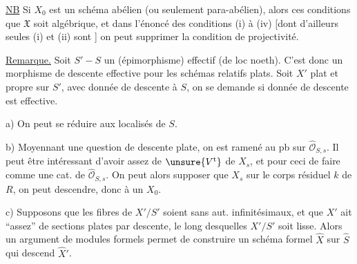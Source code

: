 \uline{NB} Si $X_0$ est un schéma abélien  (ou seulement para-abélien), alors ces conditions   que $\mathfrak X$ soit algébrique, et dans l'énoncé des conditions (i) à (iv) [dont d'ailleurs seules (i) et (ii) sont ] on peut supprimer la condition de projectivité.

\uline{Remarque.} Soit $S'\mathbin{-}S$ un
(épimorphisme) effectif (de loc noeth). C'est donc un morphisme de descente effective pour les schémas relatifs plats. Soit $X'$ plat et propre sur $S'$, avec donnée de descente à $S$, on  se demande si donnée de descente est effective.

a) On peut se réduire aux localisés  de $S$.

b) Moyennant une question de descente   plate, on est ramené au pb sur $\widehat{\mathcal O}_{S,s}$. Il peut être intéressant d'avoir  assez de $\unsure{V^{\mathrm t}}$ de $X_s$, et pour ceci de faire comme une cat.    de $\widehat{\mathcal O}_{S,s}$. On peut alors supposer que $X_s$ sur le corps résiduel $k$ de $R$, on peut descendre, donc  à un $X_0$.

c) Supposons  que les fibres de $X'/S'$ soient sans aut. infinitésimaux, et que $X'$  ait  ``assez'' de sections   plates par descente, le long desquelles $X'/S'$ soit lisse. Alors un argument de modules formels permet de construire un schéma formel $\widehat X$ sur $\widehat S$ qui descend $\widehat X'$.

